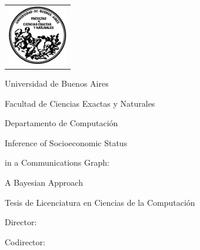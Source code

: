 \newcommand{\HRule}{\rule{\linewidth}{0.2mm}}
%
\thispagestyle{empty}

\begin{center}\leavevmode

\vspace{-2cm}

\begin{tabular}{l}
\includegraphics[width=2.6cm]{template_tesis/logofcen.pdf}
\end{tabular}

{\large \sc Universidad de Buenos Aires}

{\large \sc Facultad de Ciencias Exactas y Naturales}

{\large \sc Departamento de Computaci\'on}

\vspace{4.0cm}

\begin{bfseries}
{\huge Inference of Socioeconomic Status}

{\huge in a Communications Graph:}

{\huge A Bayesian Approach}
\end{bfseries}

\vspace{2cm}

{\large Tesis de Licenciatura en Ciencias de la Computaci\'on}

\vspace{2cm}

{\Large \autor}

\end{center}

\vfill

{\large {Director: \director}}

\vspace{.2cm}

{\large {Codirector: \codirector}}

\vspace{.2cm}

{\large {\lugar}}

\newpage\thispagestyle{empty}
